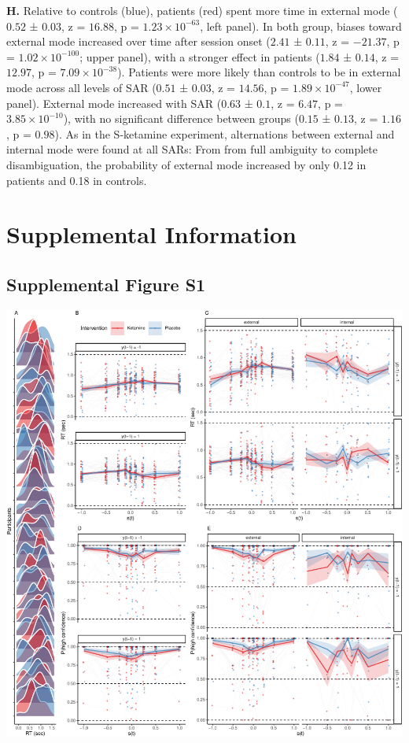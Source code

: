\documentclass[
]{article}
\begin{document}
\textbf{H.} Relative to controls (blue), patients (red) spent more time
in external mode (\(0.52\) ± \(0.03\), z = \(16.88\), p =
\(\ensuremath{1.23\times 10^{-63}}\), left panel). In both group, biases
toward external mode increased over time after session onset (\(2.41\) ±
\(0.11\), z = \(-21.37\), p = \(\ensuremath{1.02\times 10^{-100}}\);
upper panel), with a stronger effect in patients (\(1.84\) ± \(0.14\), z
= \(12.97\), p = \(\ensuremath{7.09\times 10^{-38}}\)). Patients were
more likely than controls to be in external mode across all levels of
SAR (\(0.51\) ± \(0.03\), z = \(14.56\), p =
\(\ensuremath{1.89\times 10^{-47}}\), lower panel). External mode
increased with SAR (\(0.63\) ± \(0.1\), z = \(6.47\), p =
\(\ensuremath{3.85\times 10^{-10}}\)), with no significant difference
between groups (\(0.15\) ± \(0.13\), z = \(1.16\), p = \(0.98\)). As in
the S-ketamine experiment, alternations between external and internal
mode were found at all SARs: From from full ambiguity to complete
disambiguation, the probability of external mode increased by only 0.12
in patients and 0.18 in controls.

\newpage

\hypertarget{supplemental-information}{%
\section{Supplemental Information}\label{supplemental-information}}

\hypertarget{supplemental-figure-s1}{%
\subsection{Supplemental Figure S1}\label{supplemental-figure-s1}}

\includegraphics{modes_ketamine_scz_files/figure-latex/rev_Supplemental_Figure_S1-1.pdf}
\end{document}
